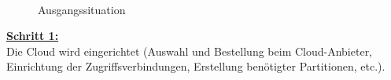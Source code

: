 \begin{figure}[H]
\centering
\begin{minipage}[t]{0.9\textwidth}
{\centering{}\\}
\caption{Ausgangssituation} %
\end{minipage}
\end{figure}

\textbf{\underline{Schritt 1:}}\\
Die Cloud wird eingerichtet (Auswahl und Bestellung beim Cloud-Anbieter, Einrichtung der Zugriffsverbindungen, Erstellung benötigter Partitionen, etc.).

